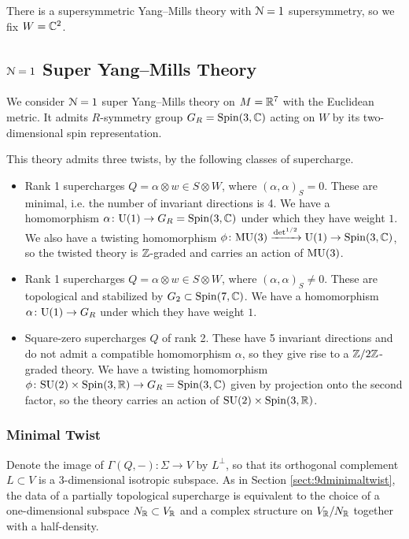 \documentclass[10pt, oneside]{article}
\begin{document}
There is a supersymmetric Yang--Mills theory with $\mathcal{N}=1$ supersymmetry, so we fix $W = \mathbb C^2$.

\subsection{\texorpdfstring{$\mathcal N=1$}{N=1} Super Yang--Mills Theory}

We consider $\mathcal N=1$ super Yang--Mills theory on $M=\mathbb R^7$ with the Euclidean metric. It admits $R$-symmetry group $G_R=\mathrm{Spin}(3, \mathbb C)$ acting on $W$ by its two-dimensional spin representation.

This theory admits three twists, by the following classes of supercharge.
\begin{itemize}
\item Rank 1 supercharges $Q=\alpha\otimes w\in S\otimes W$, where $(\alpha, \alpha)_S = 0$. These are minimal, i.e. the number of invariant directions is 4. We have a homomorphism $\alpha\colon \mathrm{U}(1)\rightarrow G_R=\mathrm{Spin}(3, \mathbb C)$ under which they have weight $1$. We also have a twisting homomorphism $\phi\colon \mathrm{MU}(3)\xrightarrow{\det^{1/2}} \mathrm{U}(1)\rightarrow \mathrm{Spin}(3, \mathbb C)$, so the twisted theory is $\mathbb Z$-graded and carries an action of $\mathrm{MU}(3)$.

\item Rank 1 supercharges $Q = \alpha \otimes w \in S \otimes W$, where $(\alpha, \alpha)_S\neq 0$. These are topological and stabilized by $G_2\subset \mathrm{Spin}(7, \mathbb C)$. We have a homomorphism $\alpha\colon \mathrm{U}(1)\rightarrow G_R$ under which they have weight $1$.

\item Square-zero supercharges $Q$ of rank 2. These have 5 invariant directions and do not admit a compatible homomorphism $\alpha$, so they give rise to a $\mathbb Z/2\mathbb Z$-graded theory. We have a twisting homomorphism $\phi\colon \mathrm{SU}(2)\times \mathrm{Spin}(3, \mathbb R)\rightarrow G_R=\mathrm{Spin}(3, \mathbb C)$ given by projection onto the second factor, so the theory carries an action of $\mathrm{SU}(2)\times\mathrm{Spin}(3, \mathbb R)$.
\end{itemize}

\subsubsection{Minimal Twist}
\label{sect:7dminimaltwist}

Denote the image of $\Gamma(Q, -)\colon \Sigma\rightarrow V$ by $L^\perp$, so that its orthogonal complement $L\subset V$ is a 3-dimensional isotropic subspace. As in Section \ref{sect:9dminimaltwist}, the data of a partially topological supercharge is equivalent to the choice of a one-dimensional subspace $N_\mathbb R\subset V_\mathbb R$ and a complex structure on $V_\mathbb R/N_\mathbb R$ together with a half-density.
\end{document}
